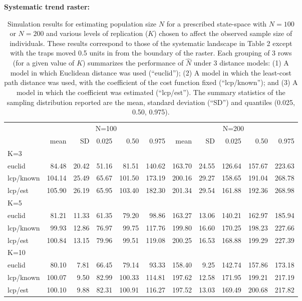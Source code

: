 \begin{table}[ht]
{\small
\caption{Simulation results for estimating population size $N$ for a prescribed state-space with
$N=100$ or $N=200$ and various levels of replication ($K$) chosen to affect the observed sample
size of individuals. These results correspond to those of the
systematic landscape in Table 2 except with the traps
moved 0.5 units in from the boundary of the raster.
Each grouping of 3 rows (for a given value of $K$) summarizes the
performance of $\hat{N}$ under 3 distance models: (1) A model in which
Euclidean distance was used (``euclid''); (2) A model in which the
least-cost path distance was used, with the coefficient of the cost
function fixed (``lcp/known''); and (3) A model in which the
coefficient was estimated (``lcp/est''). The summary statistics of the
sampling distribution reported are the mean, standard deviation
(``SD'') and quantiles (0.025, 0.50, 0.975).
}
{\bf Systematic trend raster:} \\
\begin{tabular}{l|rrrrr|rrrrr}
         & \multicolumn{5}{c}{N=100   } & \multicolumn{5}{c}{N=200  }  \\
         &   mean &  SD  & 0.025 & 0.50 & 0.975  & mean  & SD   & 0.025 & 0.50  & 0.975 \\ \hline
K=3      &        &      &       &      &        &       &      &       &       &       \\
euclid   &   84.48& 20.42& 51.16 & 81.51& 140.62 &163.70 &24.55 &126.64 &157.67 &223.63 \\
lcp/known&  104.14& 25.49& 65.67 &101.50& 173.19 &200.16 &29.27 &158.65 &191.04 &268.78\\
lcp/est  &  105.90& 26.19& 65.95 &103.40& 182.30 &201.34 &29.54 &161.88 &192.36 &268.98\\
K=5      &        &      &       &      &        &       &      &       &       &       \\
euclid   & 81.21  &11.33 &61.35  &79.20 & 98.86  &163.27 &13.06 &140.21 &162.97 &185.94\\
lcp/known& 99.93  &12.86 &76.97  &99.75 &117.76  &199.80 &16.60 &170.25 &198.23 &227.66\\
lcp/est  & 100.84 &13.15 &79.96  &99.51 &119.08  &200.25 &16.53 &168.88 &199.29 &227.39\\
K=10     &        &      &       &      &        &       &      &       &       &       \\
euclid   &  80.10 & 7.81 &66.45  &79.14 &93.33   &158.40 & 9.25 &142.74 &157.86 &173.18\\
lcp/known& 100.07 & 9.50 &82.99  &100.33&114.81  &197.62 &12.58 &171.95 &199.21 &217.19\\
lcp/est  & 100.10 & 9.88 &82.31  &100.91&116.27  &197.52 &13.03 &169.49 &200.68 &217.82\\ \hline
\end{tabular}
}
\label{tab.results3}
\end{table}






















